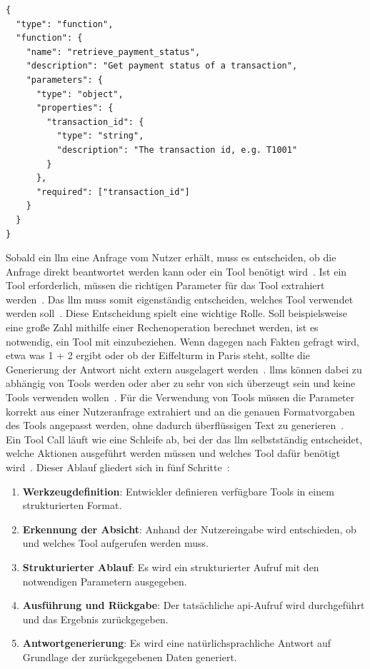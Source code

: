 \begin{lstlisting}[caption={Beispiel einer Tool-Definition als \acs{json}-Schema~\cite{tc01}}, label={lst:tool_definition}]
{
  "type": "function",
  "function": {
    "name": "retrieve_payment_status",
    "description": "Get payment status of a transaction",
    "parameters": {
      "type": "object",
      "properties": {
        "transaction_id": {
          "type": "string",
          "description": "The transaction id, e.g. T1001"
        }
      },
      "required": ["transaction_id"]
    }
  }
}
\end{lstlisting}

Sobald ein \ac{llm} eine Anfrage vom Nutzer erhält, muss es entscheiden, ob die Anfrage direkt beantwortet werden kann oder ein Tool benötigt wird~\cite{tc03}. Ist ein
Tool erforderlich, müssen die richtigen Parameter für das Tool extrahiert werden~\cite[9]{tc10}. Das \ac{llm} muss somit eigenständig entscheiden,
welches Tool verwendet werden soll~\cite{tc04}. Diese Entscheidung spielt eine wichtige Rolle. Soll beispielsweise eine große Zahl mithilfe
einer Rechenoperation berechnet werden, ist es notwendig, ein Tool mit einzubeziehen. Wenn dagegen nach Fakten gefragt wird, etwa \glqq was 1 + 2 ergibt\grqq{} oder 
\glqq ob der Eiffelturm in Paris steht\grqq, sollte die Generierung der Antwort nicht extern ausgelagert werden~\cite[19]{tc09}. \acp{llm} können dabei zu 
abhängig von Tools werden oder aber zu 
sehr von sich überzeugt sein und keine Tools verwenden wollen~\cite[17776]{tc08}. Für die Verwendung von Tools müssen die Parameter korrekt aus einer Nutzeranfrage 
extrahiert und an die genauen Formatvorgaben des Tools angepasst werden, ohne dadurch überflüssigen Text zu generieren~\cite[14\psq]{tc10}. \\
Ein Tool Call läuft wie eine Schleife ab, bei der das \ac{llm} selbstständig entscheidet, welche Aktionen ausgeführt werden müssen und welches Tool 
dafür benötigt wird~\cite{tc03}. Dieser Ablauf gliedert sich in fünf Schritte~\cite{tc07}:

\begin{enumerate}
    \item \textbf{Werkzeugdefinition}: Entwickler definieren verfügbare Tools in einem strukturierten Format.
    \item \textbf{Erkennung der Absicht}: Anhand der Nutzereingabe wird entschieden, ob und welches Tool aufgerufen werden muss.
    \item \textbf{Strukturierter Ablauf}: Es wird ein strukturierter Aufruf mit den notwendigen Parametern ausgegeben.
    \item \textbf{Ausführung und Rückgabe}: Der tatsächliche \ac{api}-Aufruf wird durchgeführt und das Ergebnis zurückgegeben.
    \item \textbf{Antwortgenerierung}: Es wird eine natürlichsprachliche Antwort auf Grundlage der zurückgegebenen Daten generiert.
\end{enumerate}

